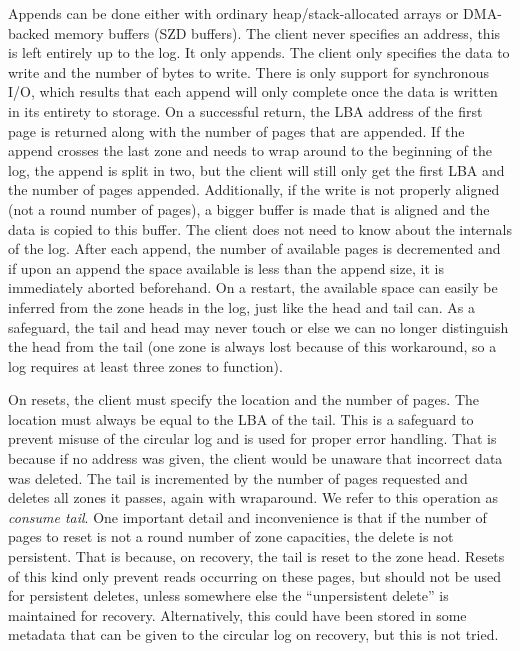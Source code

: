 Appends can be done either with ordinary heap/stack-allocated arrays or DMA-backed memory buffers (SZD buffers). The client never specifies an address, this is left entirely up to the log. It only appends. The client only specifies the data to write and the number of bytes to write. There is only support for synchronous I/O, which results that each append will only complete once the data is written in its entirety to storage. On a successful return, the LBA address of the first page is returned along with the number of pages that are appended. If the append crosses the last zone and needs to wrap around to the beginning of the log, the append is split in two, but the client will still only get the first LBA and the number of pages appended. Additionally, if the write is not properly aligned (not a round number of pages), a bigger buffer is made that is aligned and the data is copied to this buffer.  The client does not need to know about the internals of the log. After each append, the number of available pages is decremented and if upon an append the space available is less than the append size, it is immediately aborted beforehand. On a restart, the available space can easily be inferred from the zone heads in the log, just like the head and tail can. As a safeguard, the tail and head may never touch or else we can no longer distinguish the head from the tail (one zone is always lost because of this workaround, so a log requires at least three zones to function).

On resets, the client must specify the location and the number of pages. The location must always be equal to the LBA of the tail. This is a safeguard to prevent misuse of the circular log and is used for proper error handling. That is because if no address was given, the client would be unaware that incorrect data was deleted. The tail is incremented by the number of pages requested and deletes all zones it passes, again with wraparound. We refer to this operation as \textit{consume tail}. One important detail and inconvenience is that if the number of pages to reset is not a round number of zone capacities, the delete is not persistent. That is because, on recovery, the tail is reset to the zone head. Resets of this kind only prevent reads occurring on these pages, but should not be used for persistent deletes, unless somewhere else the ``unpersistent delete'' is maintained for recovery. Alternatively, this could have been stored in some metadata that can be given to the circular log on recovery, but this is not tried.   

